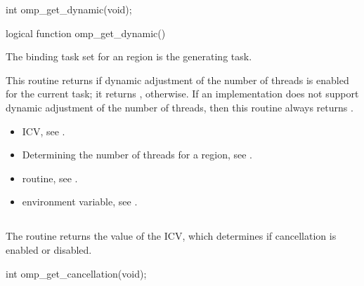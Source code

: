 \format
\begin{ccppspecific}
\begin{ompcFunction}
int omp_get_dynamic(void);
\end{ompcFunction}
\end{ccppspecific}

\begin{fortranspecific}
\begin{ompfFunction}
logical function omp_get_dynamic()
\end{ompfFunction}
\end{fortranspecific}

\binding
The binding task set for an  region is the generating task.

\effect
This routine returns  if dynamic adjustment of the number 
of threads is enabled for the current task; it returns , 
otherwise. If an implementation does not support dynamic adjustment 
of the number of threads, then this routine always returns .

\crossreferences
\begin{itemize}
\item {} ICV, see
.

\item Determining the number of threads for a  region, see
.

\item {} routine, see
.

\item {} environment variable, see
.
\end{itemize}



\subsection{}
\label{subsec:omp_get_cancellation}
\summary
The  routine returns the value of the 
 ICV, which determines if cancellation is enabled or disabled.

\format
\begin{ccppspecific}
\begin{ompcFunction}
int omp_get_cancellation(void);
\end{ompcFunction}
\end{ccppspecific}

